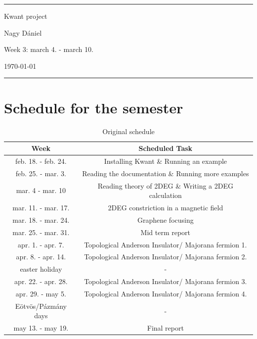 \documentclass[12pt]{article}
\numberwithin{equation}{section}
\begin{document}
\begin{center}

\thispagestyle{empty}

\rule{10 cm}{2pt}

\vspace{1.5cm}
{ \Large Kwant project}

\vspace{1.0cm}
Nagy Dániel

\vspace{0.5cm}
Week 3: march 4. - march 10.

\vspace{0.5cm}
\today

\vspace{0.25cm}
\rule{10 cm}{2pt}

\end{center}
\newpage

\newpage
{}

\section{Schedule for the semester}
\begin{table}[ht]
  \centering
  \caption{Original schedule}
  \begin{tabular}{|c|c|}
  \hline
  Week & Scheduled Task \\ [0.5ex]  \hline %
  feb. 18. - feb. 24. & Installing Kwant \& Running an example \\ \hline
  feb. 25. - mar. 3. & Reading the documentation \& Running more examples \\ \hline
  mar. 4 - mar. 10 & Reading theory of 2DEG \& Writing a 2DEG calculation \\ \hline 
  mar. 11. - mar. 17. & 2DEG constriction in a magnetic field \\ \hline
  mar. 18. -  mar. 24. & Graphene focusing \\ \hline
  mar. 25. -  mar. 31. & Mid term report \\ \hline
  apr. 1. -  apr. 7. & Topological Anderson Insulator/ Majorana fermion 1. \\ \hline
  apr. 8. -  apr. 14. & Topological Anderson Insulator/ Majorana fermion 2. \\ \hline
  easter holiday & - \\ \hline
  apr. 22. - apr. 28. & Topological Anderson Insulator/ Majorana fermion 3. \\ \hline 
  apr. 29. - may 5. & Topological Anderson Insulator/ Majorana fermion 4. \\ \hline 
  Eötvös/Pázmány days & - \\ \hline
  may 13. - may 19. & Final report \\ \hline

  \end{tabular}
\end{table}
\end{document}
